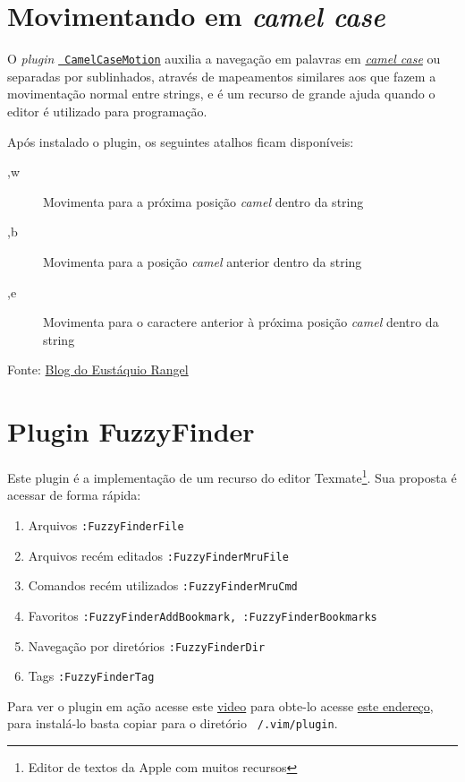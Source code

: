 \section{Movimentando em {\em camel case}}\label{Movimentando em camel case}
O {\em plugin} \href{http://www.vim.org/scripts/script.php?script\_id=1905}{{\tt
CamelCaseMotion}} auxilia a navegação em palavras em
\href{http://en.wikipedia.org/wiki/Camel\_case}{{\em camel case}} ou separadas
por sublinhados, através de mapeamentos similares aos que fazem a movimentação
normal entre strings, e é um recurso de grande ajuda quando o editor é
utilizado para programação. 

Após instalado o plugin, os seguintes atalhos ficam disponíveis:
\begin{description}
 \item [,w] Movimenta para a próxima posição {\em camel} dentro da string
 \item [,b] Movimenta para a posição {\em camel} anterior dentro da string
 \item [,e] Movimenta para o caractere anterior à próxima posição {\em camel} dentro da string
\end{description}

Fonte: \href{http://eustaquiorangel.com/posts/522}{Blog do Eustáquio Rangel}

\section{Plugin FuzzyFinder}\label{sec:Plugin FuzzyFinder}                                       
Este plugin é a implementação de um recurso do editor 
Texmate\footnote{Editor de textos da Apple com muitos recursos}.
Sua proposta é acessar de forma rápida:

\begin{enumerate}
\item Arquivos \verb|:FuzzyFinderFile|
\item Arquivos recém editados \verb|:FuzzyFinderMruFile|
\item Comandos recém utilizados \verb|:FuzzyFinderMruCmd|
\item Favoritos \verb|:FuzzyFinderAddBookmark, :FuzzyFinderBookmarks|
\item Navegação por diretórios \verb|:FuzzyFinderDir|
\item Tags {\tt :FuzzyFinderTag}
\end{enumerate}

Para ver o plugin em ação acesse este
\href{http://vimeo.com/2938498}{video} para obte-lo acesse 
 \href{http://www.vim.org/scripts/script.php?script\_id=1984}{este endereço},
para instalá-lo basta copiar para o diretório 
{\tt ~/.vim/plugin}.

